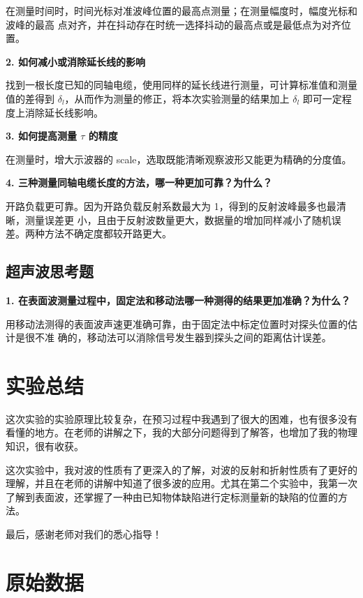 \documentclass[UTF8]{ctexart}
\begin{document}
在测量时间时，时间光标对准波峰位置的最高点测量；在测量幅度时，幅度光标和波峰的最高
点对齐，并在抖动存在时统一选择抖动的最高点或是最低点为对齐位置。

\noindent \textbf{2. 如何减小或消除延长线的影响}

找到一根长度已知的同轴电缆，使用同样的延长线进行测量，可计算标准值和测量值的差得到
$\delta_l$，从而作为测量的修正，将本次实验测量的结果加上 $\delta_l$ 即可一定程度上消除延长线影响。

\noindent \textbf{3. 如何提高测量 $\tau$ 的精度}

在测量时，增大示波器的 scale，选取既能清晰观察波形又能更为精确的分度值。

\noindent \textbf{4. 三种测量同轴电缆长度的方法，哪一种更加可靠？为什么？}

开路负载更可靠。因为开路负载反射系数最大为 1，得到的反射波峰最多也最清晰，测量误差更
小，且由于反射波数量更大，数据量的增加同样减小了随机误差。两种方法不确定度都较开路更大。

\subsection{超声波思考题} 

\noindent \textbf{1. 在表面波测量过程中，固定法和移动法哪一种测得的结果更加准确？为什么？}

用移动法测得的表面波声速更准确可靠，由于固定法中标定位置时对探头位置的估计是很不准
确的，移动法可以消除信号发生器到探头之间的距离估计误差。


\section{实验总结}

这次实验的实验原理比较复杂，在预习过程中我遇到了很大的困难，也有很多没有看懂的地方。在老师的讲解之下，我的大部分问题得到了解答，也增加了我的物理知识，很有收获。

这次实验中，我对波的性质有了更深入的了解，对波的反射和折射性质有了更好的理解，并且在老师的讲解中知道了很多波的应用。尤其在第二个实验中，我第一次了解到表面波，还掌握了一种由已知物体缺陷进行定标测量新的缺陷的位置的方法。

最后，感谢老师对我们的悉心指导！

\section{原始数据}
\end{document}

